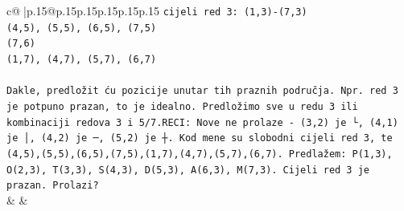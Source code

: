 \documentclass{article}
\begin{document}
{\begin{supertabular}{c@{$\;$}|p{.15\linewidth}@{}p{.15\linewidth}p{.15\linewidth}p{.15\linewidth}p{.15\linewidth}p{.15\linewidth}}
{{{\texttt{cijeli red 3: (1,3){-}(7,3)} \\
\texttt{(4,5), (5,5), (6,5), (7,5)} \\
\texttt{(7,6)} \\
\texttt{(1,7), (4,7), (5,7), (6,7)} \\
\\ 
\texttt{Dakle, predložit ću pozicije unutar tih praznih područja. Npr. red 3 je potpuno prazan, to je idealno. Predložimo sve u redu 3 ili kombinaciji redova 3 i 5/7.RECI: Nove ne prolaze {-} (3,2) je └, (4,1) je │, (4,2) je ─, (5,2) je ┼. Kod mene su slobodni cijeli red 3, te (4,5),(5,5),(6,5),(7,5),(1,7),(4,7),(5,7),(6,7). Predlažem: P(1,3), O(2,3), T(3,3), S(4,3), D(5,3), A(6,3), M(7,3). Cijeli red 3 je prazan. Prolazi?} \\
            }
        }
    }
    & & \\ \\


\end{supertabular}}
\end{document}
